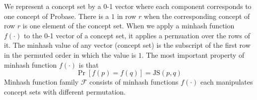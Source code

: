 We represent a concept set by a 0-1 vector where each component
corresponds to one concept of Probase. 
There is a $1$ in row $r$ when the corresponding concept of row $r$ is
one element of the concept set.
When we apply a minhash function $f(\cdot)$ to the 0-1 vector of a
concept set, it applies a permuation over the rows of it.
The minhash value of any vector (concept set) is the subscript of the
first row in the permuted order in which the value is $1$.
The most important property of minhash function $f(\cdot)$ is that
\begin{equation}
\label{eqn:minhashjs}
\Pr[f(p)=f(q)]=\text{JS}(p,q)
\end{equation}
%
%
%
Minhash function family $\mathcal{F}$ consists of minhash functions
$f(\cdot)$ each manipulates concept sets with different permutation.



